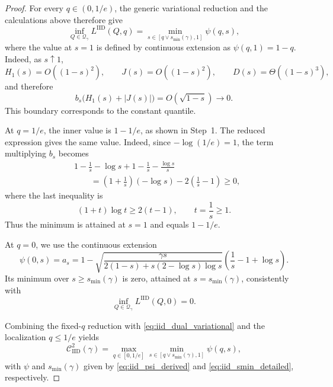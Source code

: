 \documentclass[10pt,a4paper]{amsart}
\newcommand{\CIID}{\mathcal{C}^{2}_{\mathrm{IID}}(\comp)}
\newcommand{\LIID}{L^{\mathrm{IID}}}
\newcommand{\Qgam}{\mathcal{Q}_{\comp}}
\newcommand{\comp}{\gamma}
\begin{document}
\begin{proof}
For every $q\in(0,1/e)$, the generic variational reduction and the
calculations above therefore give
\begin{equation}\label{eq:iid_fixed_q_reduction}
    \inf_{Q\in\Qgam}\LIID(Q,q)
    =
    \min_{s\in[q\vee s_{\min}(\comp),1]}
    \psi(q,s),
\end{equation}
where the value at $s=1$ is defined by continuous extension as $\psi(q,1)=1-q$. 
Indeed, as $s\uparrow1$,
\begin{equation*}
    H_1(s)=O((1-s)^2),
    \qquad
    J(s)=O((1-s)^2),
    \qquad
    D(s)=\Theta((1-s)^3),
\end{equation*}
and therefore
\begin{equation*}
    b_s\bigl(H_1(s)+|J(s)|\bigr)
    =
    O(\sqrt{1-s})
    \longrightarrow0.
\end{equation*}
This boundary corresponds to the constant quantile.

At $q=1/e$, the inner value is $1-1/e$, as shown in Step~1. The
reduced expression gives the same value. Indeed, since
$-\log(1/e)=1$, the term multiplying $b_s$ becomes
\begin{align*}
    &1-\frac1s-\log s
    +
    1-\frac1s-\frac{\log s}{s}\\
    &\qquad
    =
    \left(1+\frac1s\right)(-\log s)
    -
    2\left(\frac1s-1\right)
    \geq0,
\end{align*}
where the last inequality is
\begin{equation*}
    (1+t)\log t\geq2(t-1),
    \qquad t=\frac1s\geq1.
\end{equation*}
Thus the minimum is attained at $s=1$ and equals $1-1/e$.

At $q=0$, we use the continuous extension
\begin{equation*}
    \psi(0,s)
    =
    a_s
    =
    1-
    \sqrt{
        \frac{\comp s}{
            2(1-s)+s(2-\log s)\log s
        }
    }
    \left(
        \frac1s-1+\log s
    \right).
\end{equation*}
Its minimum over $s\geq s_{\min}(\comp)$ is zero, attained at
$s=s_{\min}(\comp)$, consistently with
\begin{equation*}
    \inf_{Q\in\Qgam}\LIID(Q,0)=0.
\end{equation*}

Combining the fixed-$q$ reduction with
\eqref{eq:iid_dual_variational} and the localization
$q\leq1/e$ yields
\begin{equation*}
    \CIID
    =
    \max_{q\in[0,1/e]}
    \min_{s\in[q\vee s_{\min}(\comp),1]}
    \psi(q,s),
\end{equation*}
with $\psi$ and $s_{\min}(\comp)$ given by
\eqref{eq:iid_psi_derived} and
\eqref{eq:iid_smin_detailed}, respectively.
\end{proof}
\end{document}

